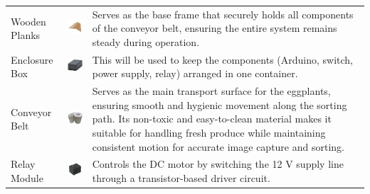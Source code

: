 {\begin{longtable}{
		>{\centering\arraybackslash}m{3cm}  
		>{\centering\arraybackslash}m{4cm} 
		>{\arraybackslash}m{6cm}
	}
	Wooden Planks &
	\includegraphics[width=3cm]{figures/planks} &
	Serves as the base frame that securely holds all components of the conveyor belt, ensuring the entire system remains steady during operation. \\
	
	Enclosure Box &
	\includegraphics[width=3cm]{figures/box} &
	This will be used to keep the components (Arduino, switch, power supply, relay) arranged in one container. \\
	
	Conveyor Belt &
	\includegraphics[width=3cm]{figures/belt} &
	Serves as the main transport surface for the eggplants, ensuring smooth and hygienic movement along the sorting path. Its non-toxic and easy-to-clean material makes it suitable for handling fresh produce while maintaining consistent motion for accurate image capture and sorting. \\
	
	Relay Module &
	\includegraphics[width=3cm]{figures/relay} &
	Controls the DC motor by switching the 12 V supply line through a transistor-based driver circuit. \\
	
\end{longtable}

}
